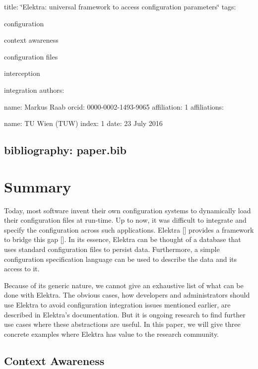 

 title\+: \char`\"{}\+Elektra\+: universal framework to access configuration parameters\char`\"{} tags\+:
\begin{DoxyItemize}
\item configuration
\item context awareness
\item configuration files
\item interception
\item integration authors\+:
\item name\+: Markus Raab orcid\+: 0000-\/0002-\/1493-\/9065 affiliation\+: 1 affiliations\+:
\item name\+: TU Wien (T\+UW) index\+: 1 date\+: 23 July 2016 \subsection*{bibliography\+: paper.\+bib }
\end{DoxyItemize}\hypertarget{md_doc_paper_paper_doc_paper_paper_md}{}\section{Summary}\label{md_doc_paper_paper_doc_paper_paper_md}
Today, most software invent their own configuration systems to dynamically load their configuration files at run-\/time. Up to now, it was difficult to integrate and specify the configuration across such applications. Elektra \mbox{[}\mbox{]} provides a framework to bridge this gap \mbox{[}\mbox{]}. In its essence, Elektra can be thought of a database that uses standard configuration files to persist data. Furthermore, a simple configuration specification language can be used to describe the data and its access to it.

Because of its generic nature, we cannot give an exhaustive list of what can be done with Elektra. The obvious cases, how developers and administrators should use Elektra to avoid configuration integration issues mentioned earlier, are described in Elektra’s documentation. But it is ongoing research to find further use cases where these abstractions are useful. In this paper, we will give three concrete examples where Elektra has value to the research community.

\subsection*{Context Awareness}

